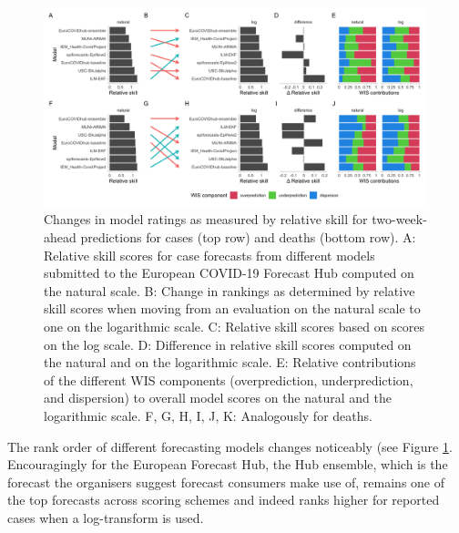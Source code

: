 \documentclass{article}
\begin{document}
\begin{figure}[h!]
    \centering
    \includegraphics[width=0.99\textwidth]{output/figures/HUB-pairwise-comparisons.png}
    \caption{Changes in model ratings as measured by relative skill for two-week-ahead predictions for cases (top row) and deaths (bottom row). A: Relative skill scores for case forecasts from different models submitted to the European COVID-19 Forecast Hub computed on the natural scale. B: Change in rankings as determined by relative skill scores when moving from an evaluation on the natural scale to one on the logarithmic scale. C: Relative skill scores based on scores on the log scale. D: Difference in relative skill scores computed on the natural and on the logarithmic scale. E: Relative contributions of the different WIS components (overprediction, underprediction, and dispersion) to overall model scores on the natural and the logarithmic scale. F, G, H, I, J, K: Analogously for deaths.}
    \label{fig:HUB-rank-order}
\end{figure}


The rank order of different forecasting models changes noticeably (see Figure \ref{fig:HUB-rank-order}. 
Encouragingly for the European Forecast Hub, the Hub ensemble, which is the forecast the organisers suggest forecast consumers make use of, remains one of the top forecasts across scoring schemes and indeed ranks higher for reported cases when a log-transform is used.
\end{document}
